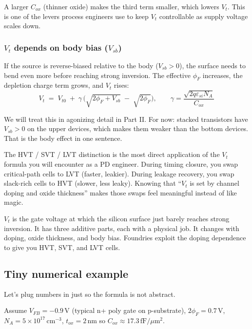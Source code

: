 \documentclass[11pt]{article}
\begin{document}
A larger $C_{ox}$ (thinner oxide) makes the third term smaller, which lowers $V_t$. This is one of the levers process engineers use to keep $V_t$ controllable as supply voltage scales down.

\subsubsection{$V_t$ depends on body bias ($V_{sb}$)}

If the source is reverse-biased relative to the body ($V_{sb} > 0$), the surface needs to bend even more before reaching strong inversion. The effective $\phi_F$ increases, the depletion charge term grows, and $V_t$ rises:
\begin{equation}
V_t \;=\; V_{t0} \;+\; \gamma\,\Big(\sqrt{2\phi_F + V_{sb}} \;-\; \sqrt{2\phi_F}\Big), \qquad \gamma = \frac{\sqrt{2q\varepsilon_{si}N_A}}{C_{ox}}
\end{equation}

We will treat this in agonizing detail in Part II. For now: stacked transistors have $V_{sb} > 0$ on the upper devices, which makes them weaker than the bottom devices. That is the body effect in one sentence.

\begin{pdnote}
The HVT / SVT / LVT distinction is the most direct application of the $V_t$ formula you will encounter as a PD engineer. During timing closure, you swap critical-path cells to LVT (faster, leakier). During leakage recovery, you swap slack-rich cells to HVT (slower, less leaky). Knowing that ``$V_t$ is set by channel doping and oxide thickness'' makes those swaps feel meaningful instead of like magic.
\end{pdnote}

\begin{checkpoint}
$V_t$ is the gate voltage at which the silicon surface just barely reaches strong inversion. It has three additive parts, each with a physical job. It changes with doping, oxide thickness, and body bias. Foundries exploit the doping dependence to give you HVT, SVT, and LVT cells.
\end{checkpoint}

\subsection{Tiny numerical example}

Let's plug numbers in just so the formula is not abstract.

Assume $V_{FB} = -0.9\,\text{V}$ (typical n+ poly gate on p-substrate), $2\phi_F = 0.7\,\text{V}$, $N_A = 5\times 10^{17}\,\text{cm}^{-3}$, $t_{ox} = 2\,\text{nm}$ so $C_{ox} \approx 17.3\,\text{fF}/\mu\text{m}^2$.
\end{document}
